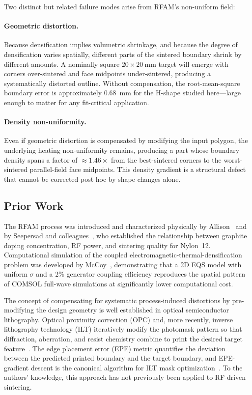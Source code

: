 \documentclass[10pt,twocolumn]{article}
\begin{document}
Two distinct but related failure modes arise from RFAM's non-uniform
field:

\paragraph{Geometric distortion.}
Because densification implies volumetric shrinkage, and because the
degree of densification varies spatially, different parts of the
sintered boundary shrink by different amounts.  A nominally square
$20 \times \SI{20}{\milli\meter}$ target will emerge with corners
over-sintered and face midpoints under-sintered, producing a
systematically distorted outline.  Without compensation, the
root-mean-square boundary error is approximately \SI{0.68}{\milli\meter}
for the H-shape studied here---large enough to matter for any
fit-critical application.

\paragraph{Density non-uniformity.}
Even if geometric distortion is compensated by modifying the input
polygon, the underlying heating non-uniformity remains, producing
a part whose boundary density spans a factor of $\approx 1.46\times$
from the best-sintered corners to the worst-sintered parallel-field
face midpoints.  This density gradient is a structural defect that
cannot be corrected post hoc by shape changes alone.

\subsection{Prior Work}

The RFAM process was introduced and characterized physically by
Allison~\cite{allison2015rfam} and by Seepersad and
colleagues~\cite{seepersad2014volumetric,seepersad2019rfam}, who
established the relationship between graphite doping concentration,
RF power, and sintering quality for Nylon~12.  Computational
simulation of the coupled electromagnetic-thermal-densification
problem was developed by McCoy~\cite{mccoy2025rfam_sim}, demonstrating
that a 2D EQS model with uniform $\sigma$ and a $2\%$ generator
coupling efficiency reproduces the spatial pattern of COMSOL
full-wave simulations at significantly lower computational cost.

The concept of compensating for systematic process-induced distortions
by pre-modifying the design geometry is well established in optical
semiconductor lithography.  Optical proximity correction (OPC) and,
more recently, inverse lithography technology (ILT) iteratively modify
the photomask pattern so that diffraction, aberration, and resist
chemistry combine to print the desired target
feature~\cite{Wong2001ilt,Poonawala2007ilt,Shen2009ilt}.  The edge
placement error (EPE) metric quantifies the deviation between the
predicted printed boundary and the target boundary, and EPE-gradient
descent is the canonical algorithm for ILT mask
optimization~\cite{Jia2014ilt}.  To the authors' knowledge, this
approach has not previously been applied to RF-driven sintering.
\end{document}
